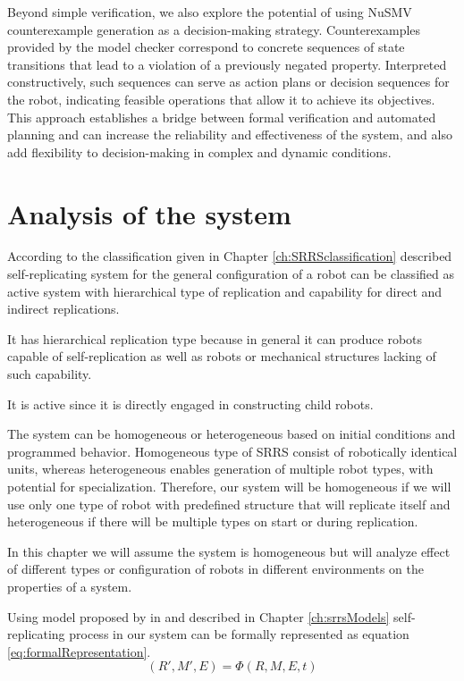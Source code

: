 Beyond simple verification, we also explore the potential of using NuSMV
counterexample generation as a decision-making strategy. Counterexamples provided 
by the model checker correspond to concrete sequences of state transitions that 
lead to a violation of a previously negated property. 
Interpreted constructively, such sequences 
can serve as action plans or decision sequences for the robot, 
indicating feasible operations that allow it to achieve its objectives. 
This approach establishes a bridge between formal verification and automated planning
and can increase the reliability and effectiveness of the system, and also
add flexibility to decision-making in complex and dynamic conditions. 


\section{Analysis of the system}

According to the classification given in Chapter \ref{ch:SRRSclassification} 
described self-replicating system for 
the general configuration of a robot can be classified as active system with 
hierarchical type of replication and capability for direct and indirect replications. 

It has hierarchical replication type because in general it can produce 
robots capable of self-replication as well as robots or mechanical structures 
lacking of such capability.

It is active since it is directly engaged in constructing child robots. 

The system can be homogeneous or heterogeneous based on initial conditions and programmed 
behavior. 
Homogeneous type of SRRS consist of robotically identical units, whereas heterogeneous 
enables generation of multiple robot types, with potential for specialization.
Therefore, our system will  be homogeneous if we will use only one type of robot with predefined 
structure that will replicate itself and heterogeneous if there will be multiple types 
on start or during replication.

In this chapter we will assume the system is homogeneous but will 
analyze effect of different types or configuration of robots in different environments
on the properties of a system.

Using model proposed by \citeauthor{Lee2007Robotic} in \cite{Lee2007Robotic} 
and described in Chapter \ref{ch:srrsModels}  self-replicating process in our system 
can be formally represented as equation \ref{eq:formalRepresentation}.
\begin{equation}
    \label{eq:formalRepresentation}
    (R' , M' , E ) = \Phi(R, M, E, t) 
\end{equation}

